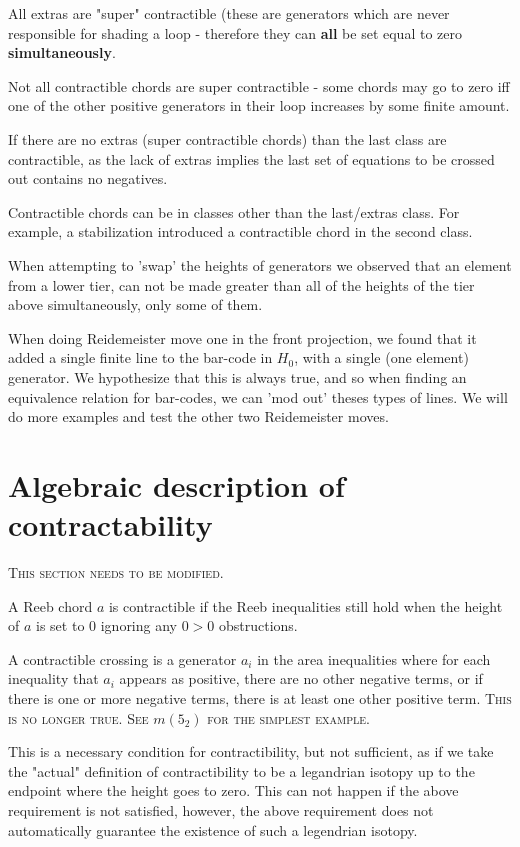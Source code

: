 \documentclass[11pt,oneside]{amsart}
\begin{document}
\begin{remark}
All extras are "super" contractible (these are generators which are never responsible for shading a loop - therefore they can \textbf{all} be set equal to zero \textbf{simultaneously}.

Not all contractible chords are super contractible - some chords may go to zero iff one of the other positive generators in their loop increases by some finite amount. 

If there are no extras (super contractible chords) than the last class are contractible, as the lack of extras implies the last set of equations to be crossed out contains no negatives. 

Contractible chords can be in classes other than the last/extras class. For example, a stabilization introduced a contractible chord in the second class.

When attempting to 'swap' the heights of generators we observed that an element from a lower tier, can not be made greater than all of the heights of the tier above simultaneously, only some of them.

When doing Reidemeister move one in the front projection, we found that it added a single finite line to the bar-code in $H_0$, with a single (one element) generator. We hypothesize that this is always true, and so when finding an equivalence relation for bar-codes, we can 'mod out' theses types of lines. We will do more examples and test the other two Reidemeister moves.    
\end{remark}


\section{Algebraic description of contractability}
{\color{red} \textsc{This section needs to be modified.}}
\begin{definition}[Contractible]
    A Reeb chord $a$ is contractible if the Reeb inequalities still hold when the height of $a$ is set to $0$ ignoring any $0>0$ obstructions.
\end{definition}

A contractible crossing is a generator $a_i$ in the area inequalities where for each inequality that $a_i$ appears as positive, there are no other negative terms, or if there is one or more negative terms, there is at least one other positive term. {\color{red} \textsc{This is no longer true. See $m(5_2)$ for the simplest example.}}

This is a necessary condition for contractibility, but not sufficient, as if we take the "actual" definition of contractibility to be a legandrian isotopy up to the endpoint where the height goes to zero. This can not happen if the above requirement is not satisfied, however, the above requirement does not automatically guarantee the existence of such a legendrian isotopy. 
\end{document}
